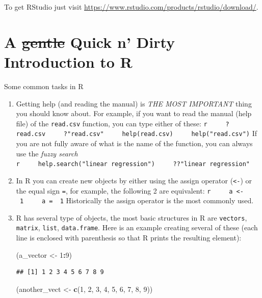 \documentclass[
]{book}
\newenvironment{Shaded}{\begin{snugshade}}{\end{snugshade}}
\newcommand{\DecValTok}[1]{\textcolor[rgb]{0.00,0.00,0.81}{#1}}
\newcommand{\FunctionTok}[1]{\textcolor[rgb]{0.13,0.29,0.53}{\textbf{#1}}}
\newcommand{\NormalTok}[1]{#1}
\newcommand{\OtherTok}[1]{\textcolor[rgb]{0.56,0.35,0.01}{#1}}
\newcommand{\SpecialCharTok}[1]{\textcolor[rgb]{0.81,0.36,0.00}{\textbf{#1}}}
\begin{document}
To get RStudio just visit \url{https://www.rstudio.com/products/rstudio/download/}.

\hypertarget{a-gentle-quick-n-dirty-introduction-to-r}{%
\section{\texorpdfstring{A \st{gentle} Quick n' Dirty Introduction to R}{A gentle Quick n' Dirty Introduction to R}}\label{a-gentle-quick-n-dirty-introduction-to-r}}

Some common tasks in R

\begin{enumerate}
\def\labelenumi{\arabic{enumi}.}
\setcounter{enumi}{-1}
\item
  Getting help (and reading the manual) is \emph{THE MOST IMPORTANT} thing you should know about. For example, if you want to read the manual (help file) of the \texttt{read.csv} function, you can type either of these:
  \texttt{r\ \ \ \ \ ?read.csv\ \ \ \ \ ?"read.csv"\ \ \ \ \ help(read.csv)\ \ \ \ \ help("read.csv")}
  If you are not fully aware of what is the name of the function, you can always use the \emph{fuzzy search}
  \texttt{r\ \ \ \ \ help.search("linear\ regression")\ \ \ \ \ ??"linear\ regression"}
\item
  In R you can create new objects by either using the assign operator (\texttt{\textless{}-}) or the equal sign \texttt{=}, for example, the following 2 are equivalent:
  \texttt{r\ \ \ \ \ a\ \textless{}-\ 1\ \ \ \ \ a\ =\ \ 1}
  Historically the assign operator is the most commonly used.
\item
  R has several type of objects, the most basic structures in R are \texttt{vectors}, \texttt{matrix}, \texttt{list}, \texttt{data.frame}. Here is an example creating several of these (each line is enclosed with parenthesis so that R prints the resulting element):

\begin{Shaded}
\begin{Highlighting}[]
\NormalTok{(a\_vector     }\OtherTok{\textless{}{-}} \DecValTok{1}\SpecialCharTok{:}\DecValTok{9}\NormalTok{)}
\end{Highlighting}
\end{Shaded}

\begin{verbatim}
## [1] 1 2 3 4 5 6 7 8 9
\end{verbatim}

\begin{Shaded}
\begin{Highlighting}[]
\NormalTok{(another\_vect }\OtherTok{\textless{}{-}} \FunctionTok{c}\NormalTok{(}\DecValTok{1}\NormalTok{, }\DecValTok{2}\NormalTok{, }\DecValTok{3}\NormalTok{, }\DecValTok{4}\NormalTok{, }\DecValTok{5}\NormalTok{, }\DecValTok{6}\NormalTok{, }\DecValTok{7}\NormalTok{, }\DecValTok{8}\NormalTok{, }\DecValTok{9}\NormalTok{))}
\end{Highlighting}
\end{Shaded}


\end{enumerate}
\end{document}
